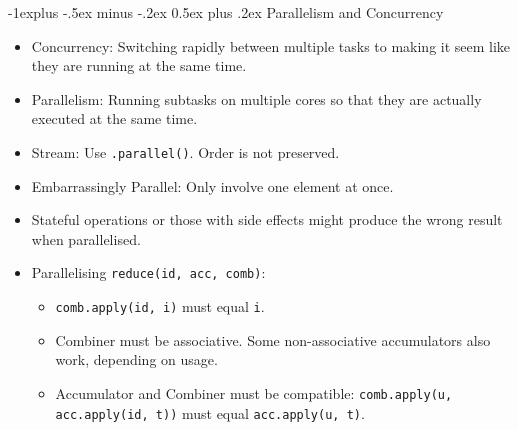 \documentclass[10pt, landscape]{article}
\makeatletter
\renewcommand{\section}{\@startsection{section}{1}{0mm}%
                                {-1ex plus -.5ex minus -.2ex}%
                                {0.5ex plus .2ex}%
                                {\normalfont\large\bfseries}}
\renewcommand{\section}{\@startsection{section}{2}{0mm}%
                                {-1explus -.5ex minus -.2ex}%
                                {0.5ex plus .2ex}%
                                {\normalfont\normalsize\bfseries}}
\makeatother
\begin{document}
\begin{multicols*}{4}
\section{Parallelism and Concurrency}
\begin{itemize}
    \item Concurrency: Switching rapidly between multiple tasks to making it seem like they are running at the same time.
    \item Parallelism: Running subtasks on multiple cores so that they are actually executed at the same time.
    \item Stream: Use \verb|.parallel()|. Order is not preserved.
    \item Embarrassingly Parallel: Only involve one element at once.
    \item Stateful operations or those with side effects might produce the wrong result when parallelised.
    \item Parallelising \verb|reduce(id, acc, comb)|:
    \begin{itemize}
        \item \verb|comb.apply(id, i)| must equal \verb|i|.
        \item Combiner must be associative. Some non-associative accumulators also work, depending on usage.
        \item Accumulator and Combiner must be compatible: \verb|comb.apply(u, acc.apply(id, t))| must equal \verb|acc.apply(u, t)|.
    \end{itemize}
\end{itemize}


\end{multicols*}
\end{document}
